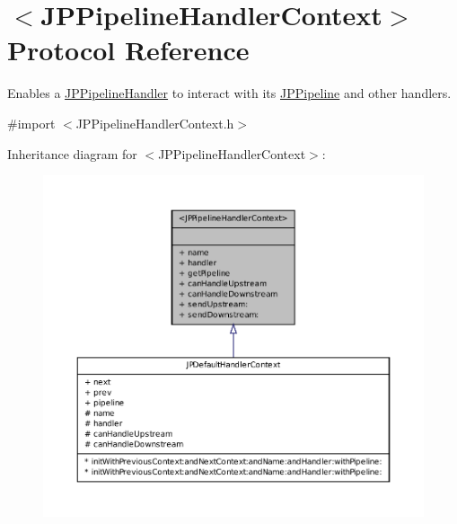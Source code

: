 \hypertarget{a00030}{
\section{$<$JPPipelineHandlerContext$>$ Protocol Reference}
\label{a00030}
}


Enables a \hyperlink{a00029}{JPPipelineHandler} to interact with its \hyperlink{a00019}{JPPipeline} and other handlers.  




{\ttfamily \#import $<$JPPipelineHandlerContext.h$>$}



Inheritance diagram for $<$JPPipelineHandlerContext$>$:\nopagebreak
\begin{figure}[H]
\begin{center}
\leavevmode
\includegraphics[width=400pt]{a00141}
\end{center}
\end{figure}
